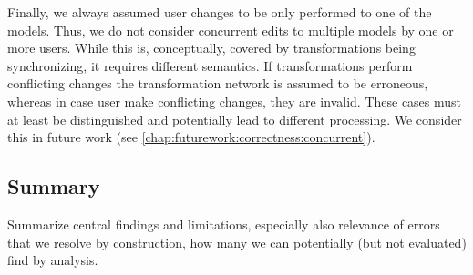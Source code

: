 Finally, we always assumed user changes to be only performed to one of the models.
Thus, we do not consider concurrent edits to multiple models by one or more users.
While this is, conceptually, covered by transformations being synchronizing, it requires different semantics.
If transformations perform conflicting changes the transformation network is assumed to be erroneous, whereas in case user make conflicting changes, they are invalid.
These cases must at least be distinguished and potentially lead to different processing.
We consider this in future work (see \autoref{chap:futurework:correctness:concurrent}).







\subsection{Summary}

Summarize central findings and limitations, especially also relevance of errors that we resolve by construction, how many we can potentially (but not evaluated) find by analysis.


